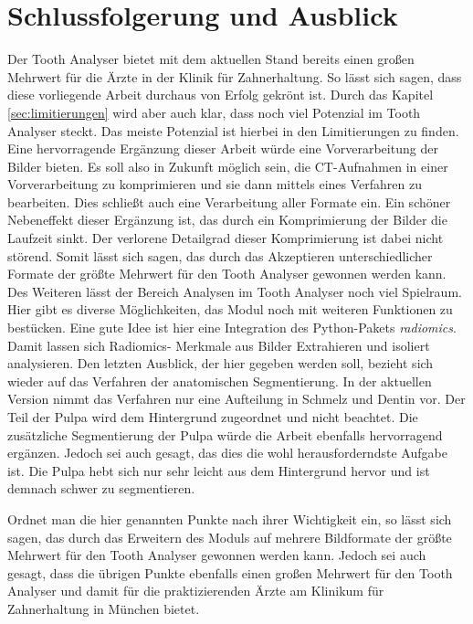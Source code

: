 \chapter{Schlussfolgerung und Ausblick}
\label{chap:schlussfolgerung} Der Tooth Analyser bietet mit dem aktuellen Stand bereits
einen großen Mehrwert für die Ärzte in der Klinik für Zahnerhaltung. So lässt
sich sagen, dass diese vorliegende Arbeit durchaus von Erfolg gekrönt ist. Durch
das Kapitel \ref{sec:limitierungen} wird aber auch klar, dass noch viel Potenzial
im Tooth Analyser steckt. Das meiste Potenzial ist hierbei in den Limitierungen
zu finden. Eine hervorragende Ergänzung dieser Arbeit würde eine Vorverarbeitung
der Bilder bieten. Es soll also in Zukunft möglich sein, die \ac{CT}-Aufnahmen
in einer Vorverarbeitung zu komprimieren und sie dann mittels eines Verfahren zu
bearbeiten. Dies schließt auch eine Verarbeitung aller Formate ein. Ein schöner
Nebeneffekt dieser Ergänzung ist, das durch ein Komprimierung der Bilder die Laufzeit
sinkt. Der verlorene Detailgrad dieser Komprimierung ist dabei nicht störend. Somit
lässt sich sagen, das durch das Akzeptieren unterschiedlicher Formate der größte
Mehrwert für den Tooth Analyser gewonnen werden kann. Des Weiteren lässt der Bereich
Analysen im Tooth Analyser noch viel Spielraum. Hier gibt es diverse
Möglichkeiten, das Modul noch mit weiteren Funktionen zu bestücken. Eine gute
Idee ist hier eine Integration des Python-Pakets \textit{radiomics}. Damit
lassen sich Radiomics- Merkmale aus Bilder Extrahieren und isoliert analysieren.
Den letzten Ausblick, der hier gegeben werden soll, bezieht sich wieder auf das
Verfahren der anatomischen Segmentierung. In der aktuellen Version nimmt das Verfahren
nur eine Aufteilung in Schmelz und Dentin vor. Der Teil der Pulpa wird dem
Hintergrund zugeordnet und nicht beachtet. Die zusätzliche Segmentierung der Pulpa
würde die Arbeit ebenfalls hervorragend ergänzen. Jedoch sei auch gesagt, das dies
die wohl herausforderndste Aufgabe ist. Die Pulpa hebt sich nur sehr leicht aus
dem Hintergrund hervor und ist demnach schwer zu segmentieren.

Ordnet man die hier genannten Punkte nach ihrer Wichtigkeit ein, so lässt sich sagen,
das durch das Erweitern des Moduls auf mehrere Bildformate der größte Mehrwert
für den Tooth Analyser gewonnen werden kann. Jedoch sei auch gesagt, dass die
übrigen Punkte ebenfalls einen großen Mehrwert für den Tooth Analyser und damit
für die praktizierenden Ärzte am Klinikum für Zahnerhaltung in München bietet.
